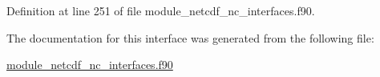 Definition at line 251 of file module\+\_\+netcdf\+\_\+nc\+\_\+interfaces.\+f90.



The documentation for this interface was generated from the following file\+:\begin{DoxyCompactItemize}
\item 
\hyperlink{module__netcdf__nc__interfaces_8f90}{module\+\_\+netcdf\+\_\+nc\+\_\+interfaces.\+f90}\end{DoxyCompactItemize}
